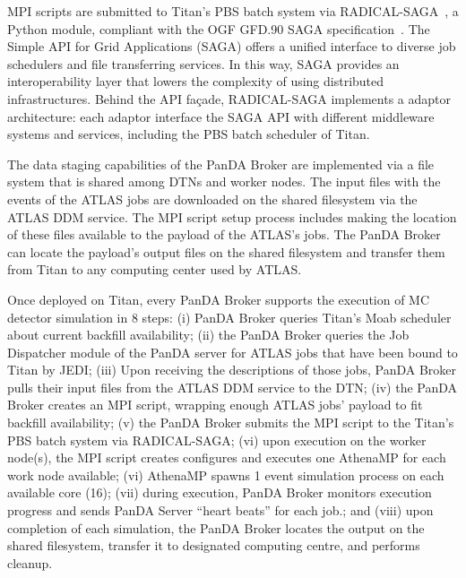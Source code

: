 MPI scripts are submitted to Titan's PBS batch system via
RADICAL-SAGA~\cite{radical-saga_url}, a Python module, compliant with the OGF
GFD.90 SAGA specification~\cite{goodale2008simple}. The Simple API for Grid
Applications (SAGA) offers a unified interface to diverse job schedulers and
file transferring services. In this way, SAGA provides an interoperability layer
that lowers the complexity of using distributed infrastructures. Behind the API
façade, RADICAL-SAGA implements a adaptor architecture: each adaptor interface
the SAGA API with different middleware systems and services, including the PBS
batch scheduler of Titan.

The data staging capabilities of the PanDA Broker are implemented via a file
system that is shared among DTNs and worker nodes. The input files with the
events of the ATLAS jobs are downloaded on the shared filesystem via the ATLAS
DDM service. The MPI script setup process includes making the location of these
files available to the payload of the ATLAS's jobs. The PanDA Broker can locate
the payload's output files on the shared filesystem and transfer them from Titan
to any computing center used by ATLAS.

Once deployed on Titan, every PanDA Broker supports the execution of MC detector
simulation in 8 steps: (i) PanDA Broker queries Titan's Moab scheduler about
current backfill availability; (ii) the PanDA Broker queries the Job Dispatcher
module of the PanDA server for ATLAS jobs that have been bound to Titan by JEDI;
(iii) Upon receiving the descriptions of those jobs, PanDA Broker pulls their
input files from the ATLAS DDM service to the DTN; (iv) the PanDA Broker creates
an MPI script, wrapping enough ATLAS jobs' payload to fit backfill availability;
(v) the PanDA Broker submits the MPI script to the Titan's PBS batch system via
RADICAL-SAGA; (vi) upon execution on the worker node(s), the MPI script creates
configures and executes one AthenaMP for each work node available; (vi) AthenaMP
spawns 1 event simulation process on each available core (16); (vii) during
execution, PanDA Broker monitors execution progress and sends PanDA Server
``heart beats'' for each job.; and (viii) upon completion of each simulation,
the PanDA Broker locates the output on the shared filesystem, transfer it to
designated computing centre, and performs cleanup.


